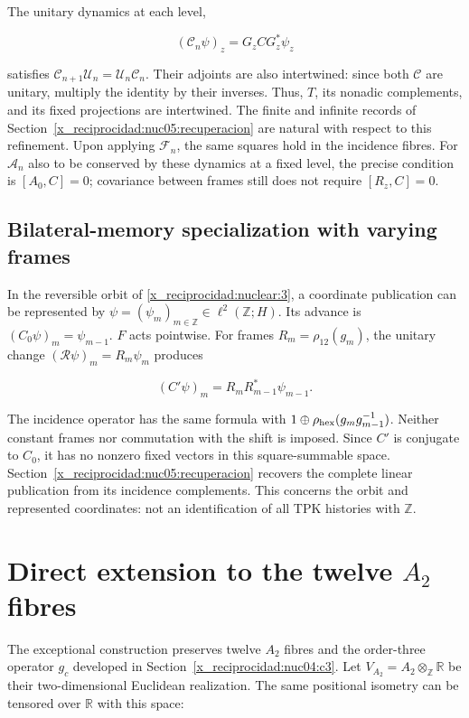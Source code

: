 The unitary dynamics at each level,

\[
(\mathscr C_n\psi)_z=G_zCG_z^*\psi_z
\]

satisfies \(\mathscr C_{n+1}\mathscr U_n=\mathscr U_n\mathscr C_n\). Their adjoints are also intertwined: since both \(\mathscr C\) are unitary, multiply the identity by their inverses. Thus, \(T\), its nonadic complements, and its fixed projections are intertwined. The finite and infinite records of Section~\ref{x_reciprocidad:nuc05:recuperacion} are natural with respect to this refinement. Upon applying \(\mathscr F_n\), the same squares hold in the incidence fibres. For \(\mathscr A_n\) also to be conserved by these dynamics at a fixed level, the precise condition is \([A_0,C]=0\); covariance between frames still does not require \([R_z,C]=0\).

\subsection{Bilateral-memory specialization with varying frames}

In the reversible orbit of \cref{x_reciprocidad:nuclear:3}, a coordinate publication can be represented by \(\psi=(\psi_m)_{m\in\mathbb Z}\in\ell^2(\mathbb Z;H)\). Its advance is \((C_0\psi)_m=\psi_{m-1}\). \(F\) acts pointwise. For frames \(R_m=\rho_{12}(g_m)\), the unitary change \((\mathscr R\psi)_m=R_m\psi_m\) produces

\[
(C'\psi)_m=R_mR_{m-1}^*\psi_{m-1}.
\]

The incidence operator has the same formula with \(1\oplus\rho_{\rm hex}(g_mg_{m-1}^{-1})\). Neither constant frames nor commutation with the shift is imposed. Since \(C'\) is conjugate to \(C_0\), it has no nonzero fixed vectors in this square-summable space. Section~\ref{x_reciprocidad:nuc05:recuperacion} recovers the complete linear publication from its incidence complements. This concerns the orbit and represented coordinates: not an identification of all TPK histories with \(\mathbb Z\).

\section{Direct extension to the twelve \texorpdfstring{\(A_2\)}{A2} fibres}\label{x_reciprocidad:nuc05:a2}

The exceptional construction preserves twelve \(A_2\) fibres and the order-three operator \(g_c\) developed in Section~\ref{x_reciprocidad:nuc04:c3}. Let \(V_{A_2}=A_2\otimes_{\mathbb Z}\mathbb R\) be their two-dimensional Euclidean realization. The same positional isometry can be tensored over \(\mathbb R\) with this space:

